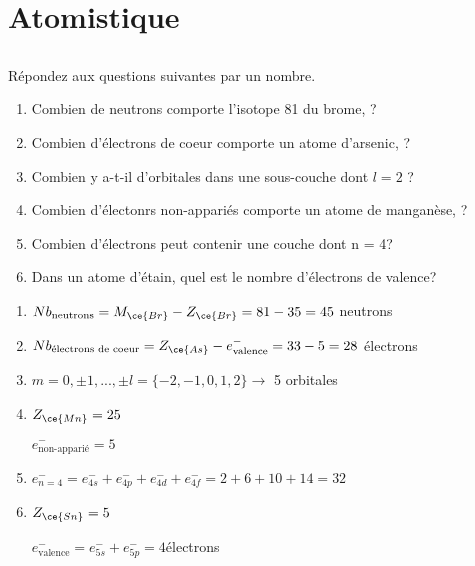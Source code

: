 \section{Atomistique}

\subsection{}
Répondez aux questions suivantes par un nombre.
\begin{enumerate}[label = (\alph*)]
	\item Combien de neutrons comporte l'isotope 81 du brome, ?
	\item Combien d'électrons de coeur comporte un atome d'arsenic, ?
	\item Combien y a-t-il d'orbitales dans une sous-couche dont $l=2$ ?
	\item Combien d'électonrs non-appariés comporte un atome de manganèse, ?
	\item Combien d'électrons peut contenir une couche dont n = 4?
	\item Dans un atome d'étain,  quel est le nombre d'électrons de valence?
\end{enumerate}

\begin{solution}
	\begin{enumerate}[label = (\alph*)]
		\item $Nb_{\text{neutrons}} = M_{\ce{Br}} - Z_{\ce{Br}} = 81 - 35 = 45$ neutrons
		\item $Nb_{\text{électrons de coeur}} = Z_{\ce{As}}  - e^-_{\text{valence}}= 33 - 5 = 28$ électrons
		\item $m = 0, \pm1, ..., \pm l = \{-2,-1,0,1,2\} \rightarrow$ 5 orbitales
		\item $Z_{\ce{Mn}} = 25$\\
			
			$e^-_{\text{non-apparié}} = 5$
			\item $e^-_{n = 4} = e^-_{4s}+e^-_{4p}+e^-_{4d}+e^-_{4f} = 2 +6+10+14 = 32$
			\item $Z_{\ce{Sn}} = 5$
			
			
			$e^-_{\text{valence}} = e^-_{5s}+e^-_{5p}=4$électrons
 	\end{enumerate}
\end{solution}

